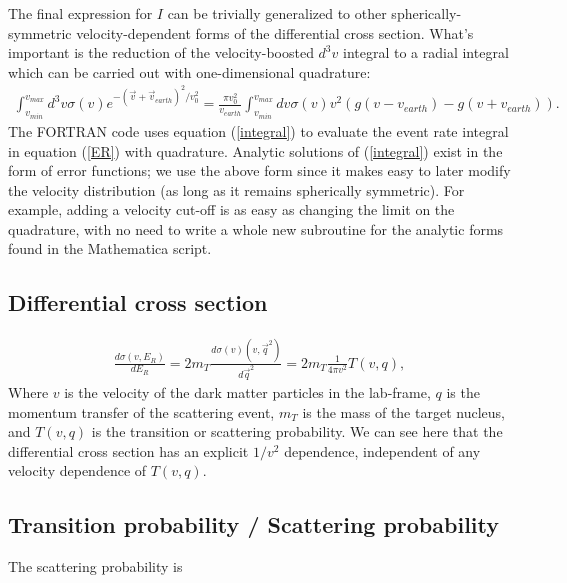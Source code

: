 \documentclass[12pt]{article}
\begin{document}
The final expression for $I$ can be trivially generalized to other spherically-
symmetric velocity-dependent forms of the differential cross section. What's 
important is the reduction of the velocity-boosted $d^3v$ integral to a radial 
integral which can be carried out with one-dimensional quadrature:
\begin{equation}\label{integral}
\begin{split}
\int_{v_{min}}^{v_{max}} d^3v \sigma(v) e^{-(\vec{v}+\vec{v}_{earth})^2/v_0^2} 
	= \frac{\pi v_0^2}{v_{earth} }\int_{v_{min}}^{v_{max}} dv \sigma(v) v^2\left( g(v-v_{earth}) - g(v+v_{earth}) \right).
\end{split}
\end{equation}
The FORTRAN code uses equation (\ref{integral}) to evaluate the event rate 
integral in equation (\ref{ER}) with quadrature. Analytic solutions of  
(\ref{integral}) exist in the form of error functions; we use the above form 
since it makes easy to later modify the velocity distribution (as long as it 
remains spherically symmetric). For example, adding a velocity cut-off is as 
easy as changing the limit on the quadrature, with no need to write a whole 
new subroutine for the analytic forms found in the Mathematica script.

\subsection{Differential cross section}\label{crosssection}
\begin{equation}
\begin{split}
\frac{d\sigma(v,E_R)}{dE_R} = 2m_T \frac{d\sigma(v)(v,\vec{q}^2)}{d\vec{q}^2} = 2m_T\frac{1}{4\pi v^2}T(v,q),
\end{split}
\end{equation}
Where $v$ is the velocity of the dark matter particles in the lab-frame, $q$ is the momentum transfer of the scattering event, $m_T$ is the mass of the target nucleus, and $T(v,q)$ is the transition or scattering probability. We can see here that the differential cross section has an explicit $1/v^2$ dependence, independent of any velocity dependence of $T(v,q)$.


\subsection{Transition probability / Scattering probability}

The scattering probability is
\end{document}
